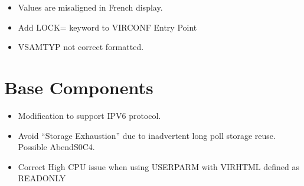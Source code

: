 \documentclass[letterpaper,10pt,english]{sphinxmanual}
\begin{document}
\sphinxAtStartPar
{}
\begin{itemize}
\item {} 
\sphinxAtStartPar
Values are mis\sphinxhyphen{}aligned in French display.

\end{itemize}

\sphinxAtStartPar
{}
\begin{itemize}
\item {} 
\sphinxAtStartPar
Add LOCK= keyword to VIRCONF Entry Point

\end{itemize}

\sphinxAtStartPar
{}
\begin{itemize}
\item {} 
\sphinxAtStartPar
VSAMTYP not correct formatted.

\end{itemize}

\newpage


\section{Base Components}
\label{\detokenize{TN202303:base-components}}
\sphinxAtStartPar
{}
\begin{itemize}
\item {} 
\sphinxAtStartPar
Modification to support IPV6 protocol.

\end{itemize}

\sphinxAtStartPar
{}
\begin{itemize}
\item {} 
\sphinxAtStartPar
Avoid “Storage Exhaustion” due to inadvertent long poll storage reuse. Possible AbendS0C4.

\end{itemize}

\sphinxAtStartPar
{}
\begin{itemize}
\item {} 
\sphinxAtStartPar
Correct High CPU issue when using USERPARM with VIRHTML defined as READONLY

\end{itemize}
\end{document}
